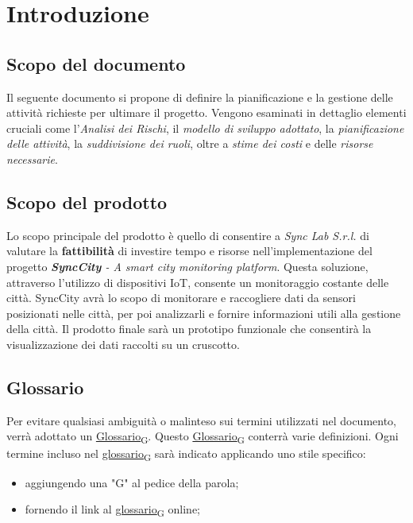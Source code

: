 \section{Introduzione}
\setcounter{subsection}{0}
\subsection{Scopo del documento}
Il seguente documento si propone di definire la pianificazione e la gestione delle attività richieste per ultimare il progetto. Vengono esaminati in dettaglio elementi cruciali come l’\textit{Analisi dei Rischi}, il \textit{modello di sviluppo adottato}, la \textit{pianificazione delle attività}, la \textit{suddivisione dei ruoli}, oltre a \textit{stime dei costi} e delle \textit{risorse necessarie}.

\subsection{Scopo del prodotto}
Lo scopo principale del prodotto è quello di consentire a \textit{Sync Lab S.r.l.} di valutare la \textbf{fattibilità} di investire tempo e risorse nell'implementazione del progetto  \textit{\textbf{SyncCity} - A smart city monitoring platform}. Questa soluzione, attraverso l'utilizzo di dispositivi IoT, consente un monitoraggio costante delle città. SyncCity avrà lo scopo di monitorare e raccogliere dati da sensori posizionati nelle città, per poi analizzarli e fornire informazioni utili alla gestione della città. Il prodotto finale sarà un prototipo funzionale che consentirà la visualizzazione dei dati raccolti su un cruscotto.

\subsection{Glossario}
Per evitare qualsiasi ambiguità o malinteso sui termini utilizzati nel documento, verrà adottato un \href{https://7last.github.io/docs/rtb/documentazione-interna/glossario#glossario}{Glossario\textsubscript{G}}. Questo \href{https://7last.github.io/docs/rtb/documentazione-interna/glossario#glossario}{Glossario\textsubscript{G}} conterrà varie definizioni. Ogni termine incluso nel \href{https://7last.github.io/docs/rtb/documentazione-interna/glossario#glossario}{glossario\textsubscript{G}} sarà indicato applicando uno stile specifico:
\begin{itemize}
    \item aggiungendo una "G" al pedice della parola;
    \item fornendo il link al \href{https://7last.github.io/docs/rtb/documentazione-interna/glossario\#glossario}{glossario\textsubscript{G}} online;
\end{itemize}

